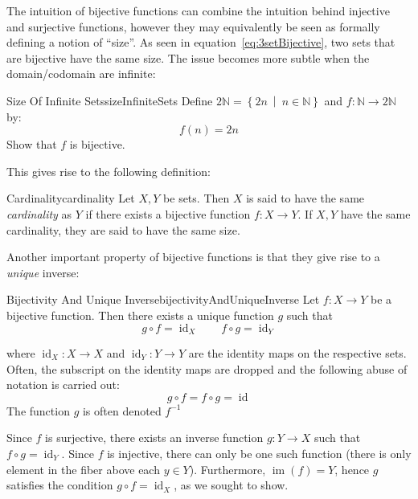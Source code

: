 \documentclass{book}
\newcommand{\N}{{\mathbb{N}}}
\newcommand{\id}{{\operatorname{id}}}
\newcommand{\im}{{\operatorname{im}}}
\newcommand{\set}[2]{\left\{#1 \ \middle|\ #2\right\}}
\begin{document}
The intuition of bijective functions can combine the intuition behind injective and surjective functions,
however they may equivalently be seen as formally defining a notion of ``size''. As seen in
equation~\ref{eq:3setBijective}, two sets that are bijective have the same size. The issue becomes more subtle
when the domain/codomain are infinite:

\begin{example}{Size Of Infinite Sets}{sizeInfiniteSets}
	Define $2\N = \set{2n}{n \in \N}$ and $f: \N \to 2\N$ by:
	\[
		f(n)  =2n
	\]
	Show that $f$ is bijective.
\end{example}

This gives rise to the following definition:
\begin{defn}{Cardinality}{cardinality}
	Let $X,Y$ be sets. Then $X$ is said to have the same \emph{cardinality} as $Y$ if there exists a bijective
	function $f: X \to Y$. If $X,Y$ have the same cardinality, they are said to have the same size.
\end{defn}

Another important property of bijective functions is that they give rise to a \emph{unique} inverse:

\begin{prop}{Bijectivity And Unique Inverse}{bijectivityAndUniqueInverse}
	Let $f: X \to Y$ be a bijective function. Then there exists a unique function $g$ such that
	\[
		g\circ f = \id_X \qquad f\circ g = \id_Y
	\]

	where $\id_X: X \to X$ and $\id_Y: Y \to Y$ are the identity maps on the respective sets. Often, the
	subscript on the identity maps are dropped and the following abuse of notation is carried out:
	\[
		g\circ f = f\circ g = \id
	\]
	The function $g$ is often denoted $f^{-1}$
\end{prop}

\begin{Proof}
	Since $f$ is surjective, there exists an inverse function $g: Y \to X$ such that $f\circ g = \id_Y$. Since
	$f$ is injective, there can only be one such function (there is only element in the fiber above each $y
	\in Y$). Furthermore, $\im(f) = Y$, hence $g$ satisfies the condition $g\circ f = \id_X$, as we sought to
	show.
\end{Proof}
\end{document}
